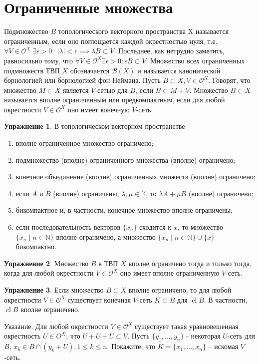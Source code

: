 \documentclass[a4paper, 12pt]{article}
\theoremstyle{definition}
\newtheorem{problem}{Упражнение}[section]
\theoremstyle{remark}
\DeclareMathOperator{\clo}{cl}
\begin{document}
\section{Ограниченные множества}
Подмножество $B$ топологического векторного пространства X называется
ограниченным, если оно поглощается каждой окрестностью нуля, т.е. $\forall V\in \mathcal O^X \; \exists \epsilon > 0: \; |\lambda|< \epsilon \implies \lambda B \subset V.$ Последнее, как нетрудно заметить, равносильно тому, что $\forall V\in \mathcal O^X \exists \epsilon > 0: \epsilon B \subset V$. Множество всех ограниченных подмножеств ТВП $X$ обозначается $\mathcal B(X)$ и называется канонической борнологией или борнологией фон Неймана. Пусть 
$B\subset X, V\in \mathcal O^X$. Говорят, что множество $M\subset X$ является $V$-сетью для $B$, если $B \subset M + V$. Множество $B\subset X$ называется вполне ограниченным или предкомпактным, если для любой окрестности $V\in \mathcal O^X$ оно имеет конечную $V$-сеть.
\begin{problem}
    В топологическом векторном пространстве
    \begin{enumerate}
        \item вполне ограниченное множество ограничено;
        \item подмножество (вполне) ограниченного множества (вполне) ограничено;
        \item конечное объединение (вполне) ограниченных множеств (вполне) ограничено;
        \item если $A$ и $B$ (вполне) ограничены, $\lambda, \mu\in \mathbb{K}$, то $\lambda A + \mu B$ (вполне) ограничено;
        \item бикомпактное и, в частности, конечное множество вполне ограничены;
        \item если последовательность векторов $\{x_n\}$ сходится к $x$, то множество $\{x_n \; |\; n\in \mathbb{N}\}$ вполне ограничено, а множество $\{x_n \;|\; n\in\mathbb{N}\}\cup \{x\}$ бикомпактно.
    \end{enumerate}
\end{problem}
\begin{problem}
    Множество $B$ в ТВП $X$ вполне ограничено тогда и только тогда, когда для любой окрестности $V\in \mathcal O ^X$ оно имеет вполне ограниченную $V$-сеть.
\end{problem}
\begin{problem}
    Если множество $B\subset X$ вполне ограничено, то для любой окрестности $V\in \mathcal O^X$ существует конечная $V$-сеть $K\subset B$ для $\clo B$. В частности, $\clo B$ вполне ограничено.

    Указание. Для любой окрестности $V\in \mathcal O^X$ существует такая уравновешенная окрестность $U\in O^X$, что $U+U+U\subset V$. Пусть $\{y_1, \dots, y_n\}$ - некоторая $U$-сеть для $B$, $x_k\in B \cap (y_k+U), 1\le k \le n.$ Покажите, что $K= \{x_1, \dots, x_n\}$ -- искомая $V$-сеть.
\end{problem}
\end{document}
